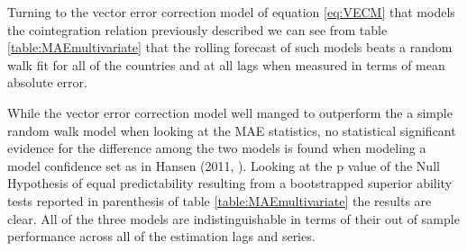 Turning to the vector error correction model of equation \ref{eq:VECM} that models the cointegration relation previously described we can see from
table \ref{table:MAEmultivariate} that the rolling forecast of such models beats a random walk fit for all of the countries and at all lags when measured
in terms of mean absolute error. 

While the vector error correction model well manged to outperform the a simple random walk model when looking at the MAE statistics, no statistical significant
evidence for the difference among the two models is found when modeling a model confidence set as in Hansen (2011, \cite{HansenMCS}). Looking at the p value
of the Null Hypothesis of equal predictability resulting from a bootstrapped superior ability tests reported in parenthesis of table \ref{table:MAEmultivariate}
the results are clear. All of the three models are indistinguishable in terms of their out of sample performance across all of the estimation lags and
series.






